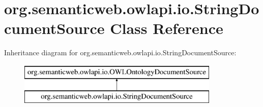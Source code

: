 \hypertarget{classorg_1_1semanticweb_1_1owlapi_1_1io_1_1_string_document_source}{\section{org.\-semanticweb.\-owlapi.\-io.\-String\-Document\-Source Class Reference}
\label{classorg_1_1semanticweb_1_1owlapi_1_1io_1_1_string_document_source}
}
Inheritance diagram for org.\-semanticweb.\-owlapi.\-io.\-String\-Document\-Source\-:\begin{figure}[H]
\begin{center}
\leavevmode
\includegraphics[height=2.000000cm]{classorg_1_1semanticweb_1_1owlapi_1_1io_1_1_string_document_source}
\end{center}
\end{figure}
